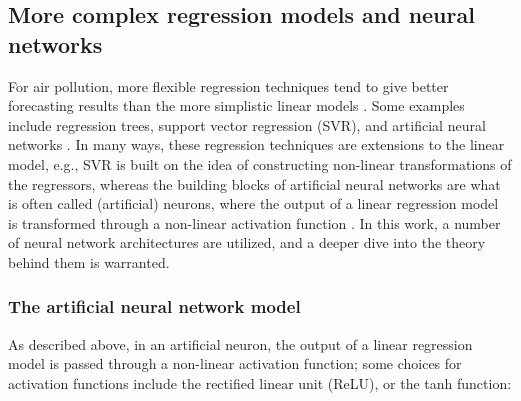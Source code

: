 
\subsection{More complex regression models and neural networks}
\label{sec:deep_learning}
For air pollution, more flexible regression techniques tend to give better forecasting results than the more simplistic linear models \cite{atmos7020015}. Some examples include regression trees, support vector regression (SVR), and artificial neural networks \cite{atmos7020015, FaganeliPucer2018}. In many ways, these regression techniques are extensions to the linear model, e.g., SVR is built on the idea of constructing non-linear transformations of the regressors, whereas the building blocks of artificial neural networks are what is often called (artificial) neurons, where the output of a linear regression model is transformed through a non-linear activation function \cite{smlbook}. In this work, a number of neural network architectures are utilized, and a deeper dive into the theory behind them is warranted. 

\subsubsection{The artificial neural network model}
As described above, in an artificial neuron, the output of a linear regression model is passed through a non-linear activation function; some choices for activation functions include the rectified linear unit (ReLU), or the tanh function:

